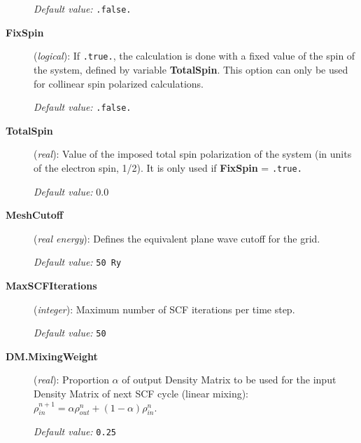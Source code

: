 \begin{description}
{\it Default value:} {\tt .false.}


\item[{\bf FixSpin}] ({\it logical}): 
If {\tt .true.}, the calculation is done with a fixed value of the
spin of the system, defined by variable  {\bf TotalSpin}.
This option can only be used for collinear spin polarized
calculations.

{\it Default value:} {\tt .false.}

\item[{\bf TotalSpin}] ({\it real}):
Value of the imposed total spin polarization of the system (in units of the
electron spin, 1/2). It is only used
if {\bf FixSpin} = {\tt .true.}

{\it Default value:} 0.0

\item[{\bf MeshCutoff}] ({\it real energy}): 
Defines the equivalent plane wave cutoff for the grid.

{\it Default value:} {\tt 50 Ry}

\item[{\bf MaxSCFIterations}] ({\it integer}): 
Maximum number of SCF iterations per time step.

{\it Default value:} {\tt 50}

\item[{\bf DM.MixingWeight}] ({\it real}):
Proportion $\alpha$ of 
output Density Matrix to be used for the input Density Matrix of 
next SCF cycle (linear mixing):
$\rho^{n+1}_{in} = \alpha \rho^{n}_{out} 
+(1 - \alpha) \rho^{n}_{in}$.

{\it Default value:} {\tt 0.25}


\end{description}
